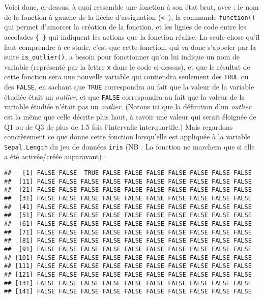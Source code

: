 \documentclass[
  french,
]{book}
\newenvironment{Shaded}{\begin{snugshade}}{\end{snugshade}}
\newcommand{\DataTypeTok}[1]{\textcolor[rgb]{0.13,0.29,0.53}{#1}}
\newcommand{\KeywordTok}[1]{\textcolor[rgb]{0.13,0.29,0.53}{\textbf{#1}}}
\newcommand{\NormalTok}[1]{#1}
\newcommand{\OperatorTok}[1]{\textcolor[rgb]{0.81,0.36,0.00}{\textbf{#1}}}
\begin{document}
Voici donc, ci-dessus, à quoi ressemble une fonction à son état brut, avec : le nom de la fonction à gauche de la flèche d'assignation (\texttt{\textless{}-}), la commande \texttt{function()} qui permet d'amorcer la création de la fonction, et les lignes de code entre les accolades \texttt{\{\ \}} qui indiquent les actions que la fonction réalise. La seule chose qu'il faut comprendre à ce stade, c'est que cette fonction, qui va donc s'appeler par la suite \texttt{is\_outlier()}, a besoin pour fonctionner qu'on lui indique un nom de variable (représenté par la lettre \texttt{x} dans le code ci-dessus), et que le résultat de cette fonction sera une nouvelle variable qui contiendra seulement des \texttt{TRUE} ou des \texttt{FALSE}, en sachant que \texttt{TRUE} correspondra au fait que la valeur de la variable étudiée était un \emph{outlier}, et que \texttt{FALSE} correspondra au fait que la valeur de la variable étudiée n'était pas un \emph{outlier}. (Notons ici que la définition d'un \emph{outlier} est la même que celle décrite plus haut, à savoir une valeur qui serait éloignée de Q1 ou de Q3 de plus de 1.5 fois l'intervalle interquartile.) Mais regardons concrètement ce que donne cette fonction lorsqu'elle est appliquée à la variable \texttt{Sepal.Length} du jeu de données \texttt{iris} (NB : La fonction ne marchera que si elle a été activée/créée auparavant) :

\begin{Shaded}
\end{Shaded}

\begin{verbatim}
##   [1] FALSE FALSE  TRUE FALSE FALSE FALSE FALSE FALSE FALSE FALSE
##  [11] FALSE FALSE FALSE FALSE FALSE FALSE FALSE FALSE FALSE FALSE
##  [21] FALSE FALSE FALSE FALSE FALSE FALSE FALSE FALSE FALSE FALSE
##  [31] FALSE FALSE FALSE FALSE FALSE FALSE FALSE FALSE FALSE FALSE
##  [41] FALSE FALSE FALSE FALSE FALSE FALSE FALSE FALSE FALSE FALSE
##  [51] FALSE FALSE FALSE FALSE FALSE FALSE FALSE FALSE FALSE FALSE
##  [61] FALSE FALSE FALSE FALSE FALSE FALSE FALSE FALSE FALSE FALSE
##  [71] FALSE FALSE FALSE FALSE FALSE FALSE FALSE FALSE FALSE FALSE
##  [81] FALSE FALSE FALSE FALSE FALSE FALSE FALSE FALSE FALSE FALSE
##  [91] FALSE FALSE FALSE FALSE FALSE FALSE FALSE FALSE FALSE FALSE
## [101] FALSE FALSE FALSE FALSE FALSE FALSE FALSE FALSE FALSE FALSE
## [111] FALSE FALSE FALSE FALSE FALSE FALSE FALSE FALSE FALSE FALSE
## [121] FALSE FALSE FALSE FALSE FALSE FALSE FALSE FALSE FALSE FALSE
## [131] FALSE FALSE FALSE FALSE FALSE FALSE FALSE FALSE FALSE FALSE
## [141] FALSE FALSE FALSE FALSE FALSE FALSE FALSE FALSE FALSE FALSE
\end{verbatim}
\end{document}
